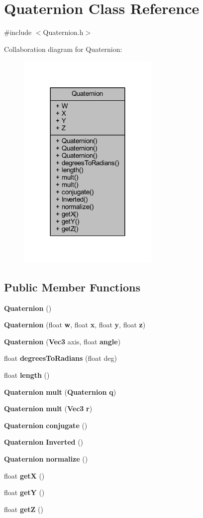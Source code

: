\section{Quaternion Class Reference}
\label{class_quaternion}


{\ttfamily \#include $<$Quaternion.\+h$>$}



Collaboration diagram for Quaternion\+:\nopagebreak
\begin{figure}[H]
\begin{center}
\leavevmode
\includegraphics[width=192pt]{d4/dfc/class_quaternion__coll__graph}
\end{center}
\end{figure}
\subsection*{Public Member Functions}
\begin{DoxyCompactItemize}
\item 
{\bf Quaternion} ()
\item 
{\bf Quaternion} (float {\bf w}, float {\bf x}, float {\bf y}, float {\bf z})
\item 
{\bf Quaternion} ({\bf Vec3} axis, float {\bf angle})
\item 
float {\bf degrees\+To\+Radians} (float deg)
\item 
float {\bf length} ()
\item 
{\bf Quaternion} {\bf mult} ({\bf Quaternion} {\bf q})
\item 
{\bf Quaternion} {\bf mult} ({\bf Vec3} {\bf r})
\item 
{\bf Quaternion} {\bf conjugate} ()
\item 
{\bf Quaternion} {\bf Inverted} ()
\item 
{\bf Quaternion} {\bf normalize} ()
\item 
float {\bf get\+X} ()
\item 
float {\bf get\+Y} ()
\item 
float {\bf get\+Z} ()
\end{DoxyCompactItemize}
